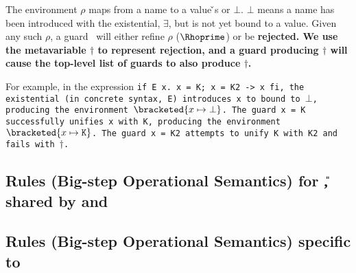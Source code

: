\documentclass[manuscript,screen,review, 12pt, nonacm]{acmart}
\begin{document}


The environment $\rho$ maps from a name to a value {\v}s or $\bot$. $\bot$ means
a name has been introduced with the existential, $\exists$, but is not yet bound
to a value. Given any such $\rho$, a guard \g\ will either refine $\rho$
($\Rhoprime$) or be \bf{rejected}. We use the metavariable $\dagger$ to
represent rejection, and a guard producing $\dagger$ will cause the top-level
list of guards to also produce $\dagger$. 

    \gfail

  For example, in the \VMinus expression \tt{if E x. x = K; x = K2 -> x fi}, the
  existential (in concrete syntax, \tt{E}) introduces \tt{x} to \Rho bound to
  $\bot$, producing the environment $\bracketed{x \mapsto \bot}$. The guard
  \tt{x = K} successfully unifies \tt{x} with \tt{K}, producing the environment
  $\bracketed{x \mapsto \tt{K}}$. The guard \tt{x = K2} attempts to unify \tt{K}
  with \tt{K2} and fails with $\dagger$. 

    
    \vfilbreak
    
    \subsection{Rules (Big-step Operational Semantics) for \U, shared by \VMinus and \D}
    \label{usemantics1}
    \usemantics 
    \subsection{Rules (Big-step Operational Semantics) specific to \VMinus}
    \label{vmsemantics}
    \vmsemantics
\end{document}
